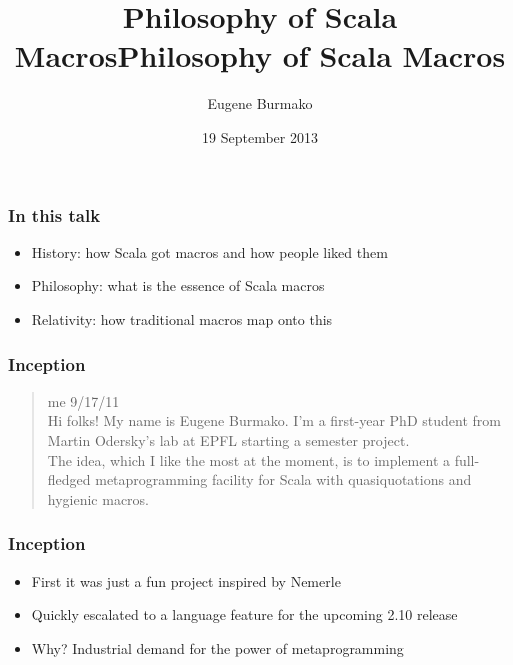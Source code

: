 \documentclass[svgnames,hyperref={bookmarks=false}]{beamer}
\title{Philosophy of Scala Macros}
\begin{document}
\title{Philosophy of Scala Macros}
\author{Eugene Burmako}
\date{19 September 2013}
{
\begin{frame}
  \titlepage
\end{frame}
}

\begin{frame}[fragile]
\frametitle{In this talk}

\begin{itemize}
\item History: how Scala got macros and how people liked them
\item Philosophy: what is the essence of Scala macros
\item Relativity: how traditional macros map onto this
\end{itemize}
\end{frame}

\begin{frame}[fragile]
\frametitle{}

\vskip40pt
\begin{center}
\end{center}
\end{frame}

\begin{frame}[fragile]
\frametitle{Inception}

\begin{quote}
me 9/17/11\\
\vskip10pt
Hi folks! My name is Eugene Burmako. I'm a first-year PhD student from Martin Odersky's lab at EPFL
starting a semester project.\\
\vskip10pt
The idea, which I like the most at the moment, is to implement
a full-fledged metaprogramming facility for Scala with quasiquotations and hygienic macros.
\end{quote}
\end{frame}

\begin{frame}[fragile]
\frametitle{Inception}

\begin{itemize}
\item First it was just a fun project inspired by Nemerle
\item Quickly escalated to a language feature for the upcoming 2.10 release
\item Why? Industrial demand for the power of metaprogramming
\end{itemize}
\end{frame}
\end{document}
